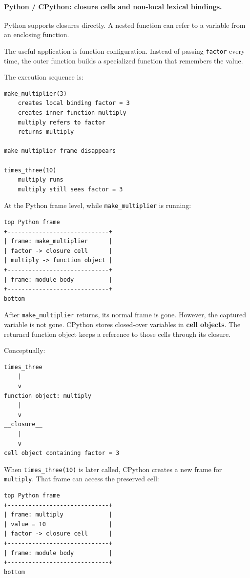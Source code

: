 \paragraph{Python / CPython: closure cells and non-local lexical bindings.}

Python supports closures directly. A nested function can refer to a variable from an enclosing function.

The useful application is function configuration. Instead of passing \texttt{factor} every time, the outer function builds a specialized function that remembers the value.

The execution sequence is:

\begin{verbatim}
make_multiplier(3)
    creates local binding factor = 3
    creates inner function multiply
    multiply refers to factor
    returns multiply

make_multiplier frame disappears

times_three(10)
    multiply runs
    multiply still sees factor = 3
\end{verbatim}

At the Python frame level, while \texttt{make\_multiplier} is running:

\begin{verbatim}
top Python frame
+-----------------------------+
| frame: make_multiplier      |
| factor -> closure cell      |
| multiply -> function object |
+-----------------------------+
| frame: module body          |
+-----------------------------+
bottom
\end{verbatim}

After \texttt{make\_multiplier} returns, its normal frame is gone. However, the captured variable is not gone. CPython stores closed-over variables in \textbf{cell objects}. The returned function object keeps a reference to those cells through its closure.

Conceptually:

\begin{verbatim}
times_three
    |
    v
function object: multiply
    |
    v
__closure__
    |
    v
cell object containing factor = 3
\end{verbatim}

When \texttt{times\_three(10)} is later called, CPython creates a new frame for \texttt{multiply}. That frame can access the preserved cell:

\begin{verbatim}
top Python frame
+-----------------------------+
| frame: multiply             |
| value = 10                  |
| factor -> closure cell      |
+-----------------------------+
| frame: module body          |
+-----------------------------+
bottom
\end{verbatim}

